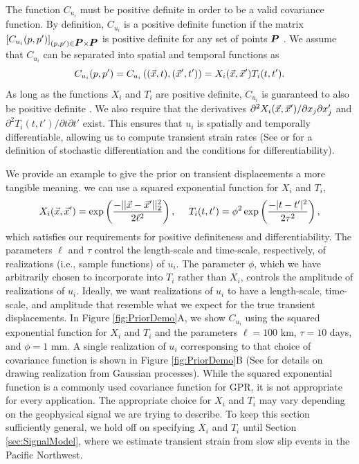 \documentclass[extra,mreferee]{gji}
\begin{document}
The function $C_{u_i}$ must be positive definite in order to be a
valid covariance function. By definition, $C_{u_i}$ is a positive
definite function if the matrix $[C_{u_i}(p,p')]_{(p,p') \in \points
\times \points}$ is positive definite for any set of points $\points$
\citep[sec. 2.5]{Cressie1992}. We assume that $C_{u_i}$ can be
separated into spatial and temporal functions as
\begin{equation}\label{eq:TransientCovariance}
C_{u_i}(p,p') = C_{u_i}\left((\vec{x},t),(\vec{x}',t')\right) 
              = X_i(\vec{x},\vec{x}')T_i(t,t').
\end{equation}   
As long as the functions $X_i$ and $T_i$ are positive definite,
$C_{u_i}$ is guaranteed to also be positive definite \citep[sec.
4.2.4]{Rasmussen2006}. We also require that the derivatives
$\partial^2 X_i(\vec{x},\vec{x}')/ \partial x_j \partial x_j'$ and
$\partial^2 T_i(t,t') / \partial t \partial t'$ exist. This ensures
that $u_i$ is spatially and temporally differentiable, allowing us to
compute transient strain rates (See \citet[sec. 2.2]{Adler1981} or
\citet[sec. 10A]{Papoulis1991} for a definition of stochastic
differentiation and the conditions for differentiability).


We provide an example to give the prior on transient displacements a
more tangible meaning. we can use a squared exponential function for
$X_i$ and $T_i$,
\begin{equation}\label{eq:ExampleCov}
X_i(\pos,\pos') = \exp\left(\frac{-||\pos - \pos'||_2^2}{2\ell^2}\right), \ \ \ \ 
T_i(t,t') = \phi^2 \exp\left(\frac{-|t - t'|^2}{2\tau^2}\right),
\end{equation}
which satisfies our requirements for positive definiteness and
differentiability. The parameters $\ell$ and $\tau$ control the
length-scale and time-scale, respectively, of realizations (i.e.,
sample functions) of $u_i$. The parameter $\phi$, which we have
arbitrarily chosen to incorporate into $T_i$ rather than $X_i$,
controls the amplitude of realizations of $u_i$. Ideally, we want
realizations of $u_i$ to have a length-scale, time-scale, and
amplitude that resemble what we expect for the true transient
displacements. In Figure \ref{fig:PriorDemo}A, we show $C_{u_i}$ using
the squared exponential function for $X_i$ and $T_i$ and the
parameters $\ell = 100$ km, $\tau = 10$ days, and $\phi = 1$ mm. A
single realization of $u_i$ corresponsing to that choice of covariance
function is shown in Figure \ref{fig:PriorDemo}B (See \citet[sec.
A3]{Rasmussen2006} for details on drawing realization from Gaussian
processes). While the squared exponential function is a commonly used
covariance function for GPR, it is not appropriate for every
application. The appropriate choice for $X_i$ and $T_i$ may vary
depending on the geophysical signal we are trying to describe. To keep
this section sufficiently general, we hold off on specifying $X_i$ and
$T_i$ until Section \ref{sec:SignalModel}, where we estimate transient
strain from slow slip events in the Pacific Northwest.
\end{document}
